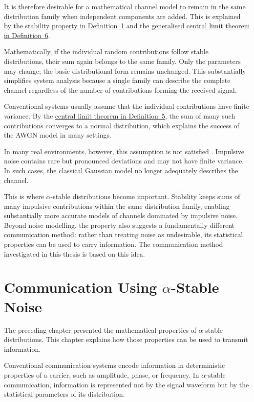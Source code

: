 \documentclass[a4paper, 12pt, openany]{book}
\begin{document}
It is therefore desirable for a mathematical channel model to remain in the same distribution family when independent components are added. This is explained by the \hyperref[def:stable]{stability property in Definition~1} and the \hyperref[def:GCLI]{generalised central limit theorem in Definition~6}.

Mathematically, if the individual random contributions follow stable distributions, their sum again belongs to the same family. Only the parameters may change; the basic distributional form remains unchanged. This substantially simplifies system analysis because a single family can describe the complete channel regardless of the number of contributions forming the received signal.

Conventional systems usually assume that the individual contributions have finite variance. By the \hyperref[def:CLI]{central limit theorem in Definition~5}, the sum of many such contributions converges to a normal distribution, which explains the success of the AWGN model in many settings.

In many real environments, however, this assumption is not satisfied \cite{madi2011impacts}. Impulsive noise contains rare but pronounced deviations and may not have finite variance. In such cases, the classical Gaussian model no longer adequately describes the channel.

This is where $\alpha$-stable distributions become important. Stability keeps sums of many impulsive contributions within the same distribution family, enabling substantially more accurate models of channels dominated by impulsive noise. Beyond noise modelling, the property also suggests a fundamentally different communication method: rather than treating noise as undesirable, its statistical properties can be used to carry information. The communication method investigated in this thesis is based on this idea.



\chapter{Communication Using $\alpha$-Stable Noise}
The preceding chapter presented the mathematical properties of $\alpha$-stable distributions. This chapter explains how those properties can be used to transmit information.

Conventional communication systems encode information in deterministic properties of a carrier, such as amplitude, phase, or frequency. In $\alpha$-stable communication, information is represented not by the signal waveform but by the statistical parameters of its distribution.
\end{document}

